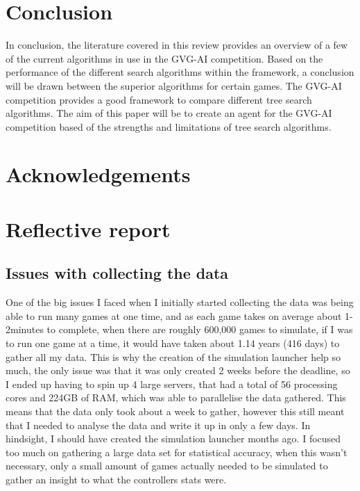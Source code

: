 \documentclass[journal]{IEEEtran}
\begin{document}
\section{Conclusion}
	In conclusion, the literature covered in this review provides an overview of a few of the current algorithms in use in the GVG-AI competition.
	Based on the performance of the different search algorithms within the framework, a conclusion will be drawn between the superior algorithms for certain games.
	The GVG-AI competition provides a good framework to compare different tree search algorithms. 
	The aim of this paper will be to create an agent for the GVG-AI competition based of the strengths and limitations of tree search algorithms.
	 



	\appendices
		\section{Acknowledgements}

		\section{Reflective report}
		\subsection{Issues with collecting the data}
			One of the big issues I faced when I initially started collecting the data was being able to run many games at one time, and as each game takes on average about 1-2minutes to complete, when there are roughly 600,000 games to simulate, if I was to run one game at a time, it would have taken about 1.14 years (416 days) to gather all my data. This is why the creation of the simulation launcher help so much, the only issue was that it was only created 2 weeks before the deadline, so I ended up having to spin up 4 large servers, that had a total of 56 processing cores and 224GB of RAM, which was able to parallelise the data gathered. This means that the data only took about a week to gather, however this still meant that I needed to analyse the data and write it up in only a few days. In hindsight, I should have created the simulation launcher months ago.
			I focused too much on gathering  a large data set for statistical accuracy, when this wasn't necessary, only a small amount of games actually needed to be simulated to gather an insight to what the controllers stats were.
\end{document}
